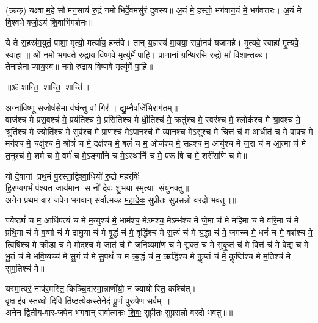 (ऋक्)   यक्ष्वाम॒हे सौमन॒साय॑ रु॒द्रं नमोभिर्दे॒वमसु॑रं दुवस्य॥ अ॒यं मे॒ हस्तो॒ भग॑वान॒यं मे॒ भग॑वत्तरः। अ॒यं मे वि॒श्वभेषजो॒ऽयं शि॒वाभि॑मर्शनः॥

ये ते॑ स॒हस्र॑म॒युतं॒ पाशा॒ मृत्यो॒ मर्त्या॑य॒ हन्त॑वे। तान् य॒ज्ञस्य॑ मा॒यया॒ सर्वा॒नव॑ यजामहे। मृ॒त्यवे॒ स्वाहा॑ मृ॒त्यवे॒ स्वाहा॥ ओं नमो भगवते रुद्राय विष्णवे मृत्यु॑र्मे पा॒हि। प्राणानां ग्रन्थिरसि रुद्रो मा॑ विशा॒न्तकः। तेनान्नेनाप्याय॒स्व॥ नमो रुद्राय विष्णवे मृत्यु॑र्मे पा॒हि॥\rbrack
 
\centerline{॥ॐ शान्ति॒ शान्ति॒ शान्ति॑॥}

{\small \closesection}

\newcommand{\cham}[3]{\refstepcounter{cj}%
#1\\
अनेन #2-वार-जपेन भगवान् सर्वात्मकः \underline{#3} सुप्रीतः सुप्रसन्नो वरदो भवतु॥\devanumber{\arabic{cj}}॥}

अग्ना॑विष्णू स॒जोष॑से॒मा व॑र्धन्तु वां॒ गिर॑। द्यु॒म्नैर्वाजे॑भि॒राग॑तम्॥ \\
वाज॑श्च मे प्रस॒वश्च॑ मे॒ प्रय॑तिश्च मे॒ प्रसि॑तिश्च मे धी॒तिश्च॑ मे॒ क्रतु॑श्च मे॒ स्वर॑श्च मे॒ श्लोक॑श्च मे श्रा॒वश्च॑ मे॒ श्रुति॑श्च मे॒ ज्योति॑श्च मे॒ सुव॑श्च मे प्रा॒णश्च॑ मेऽपा॒नश्च॑ मे व्या॒नश्च॒ मेऽसु॑श्च मे चि॒त्तं च॑ म॒ आधी॑तं च मे॒ वाक्च॑ मे॒ मन॑श्च मे॒ चक्षु॑श्च मे॒ श्रोत्रं॑ च मे॒ दक्ष॑श्च मे॒ बलं॑ च म॒ ओज॑श्च मे॒ सह॑श्च म॒ आयु॑श्च मे ज॒रा च॑ म आ॒त्मा च॑ मे त॒नूश्च॑ मे॒ शर्म॑ च मे॒ वर्म॑ च मे॒ऽङ्गा॑नि च मे॒ऽस्थानि॑ च मे॒ परूषि च मे॒ शरी॑राणि च मे॥

\cham{यो दे॒वानां प्रथ॒मं पु॒रस्ता॒द्विश्वा॒धियो॑ रु॒द्रो महर्‌षिः॑।\\
हि॒र॒ण्य॒ग॒र्भं प॑श्यत॒ जाय॑मान॒ स नो॑ दे॒वः शु॒भया॒ स्मृत्या॒ संयु॑नक्तु॥}{प्रथम}{महादेवः}

ज्यैष्ठ्यं॑ च म॒ आधि॑पत्यं च मे म॒न्युश्च॑ मे॒ भाम॑श्च॒ मेऽम॑श्च॒ मेऽम्भ॑श्च मे जे॒मा च॑ मे महि॒मा च॑ मे वरि॒मा च॑ मे प्रथि॒मा च॑ मे व॒र्ष्मा च॑ मे द्राघु॒या च॑ मे वृ॒द्धं च॑ मे॒ वृद्धि॑श्च मे स॒त्यं च॑ मे श्र॒द्धा च॑ मे॒ जग॑च्च मे॒ धनं॑ च मे॒ वश॑श्च मे॒ त्विषि॑श्च मे क्री॒डा च॑ मे॒ मोद॑श्च मे जा॒तं च॑ मे जनि॒ष्यमा॑णं च मे सू॒क्तं च॑ मे सुकृ॒तं च॑ मे वि॒त्तं च॑ मे॒ वेद्यं॑ च मे भू॒तं च॑ मे भवि॒ष्यच्च॑ मे सु॒गं च॑ मे सु॒पथं॑ च म ऋ॒द्धं च॑ म॒ ऋद्धि॑श्च मे कॢ॒प्तं च॑ मे॒ कॢप्ति॑श्च मे म॒तिश्च॑ मे सुम॒तिश्च॑ मे॥

\cham{यस्मा॒त्परं॒ नाप॑र॒मस्ति॒ किञ्चि॒द्यस्मा॒न्नाणी॑यो॒ न ज्यायोस्ति॒ कश्चि॑त्।\\
वृ॒क्ष इ॑व स्तब्धो दि॒वि ति॑ष्ठ॒त्येक॒स्तेने॒दं पू॒र्णं पुरु॑षेण॒ सर्वम्॥}{द्वितीय}{शिवः}

